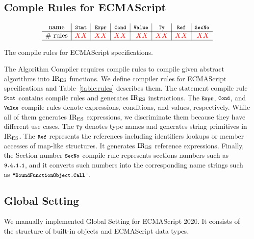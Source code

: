 \subsection{Comple Rules for ECMAScript}

\begin{table}
  \centering
  \[
    \begin{array}{c|r|r|r|r|r|r|r}
      \text{name}
      & \multicolumn{1}{c|}{\code{Stmt}}
      & \multicolumn{1}{c|}{\code{Expr}}
      & \multicolumn{1}{c|}{\code{Cond}}
      & \multicolumn{1}{c|}{\code{Value}}
      & \multicolumn{1}{c|}{\code{Ty}}
      & \multicolumn{1}{c|}{\code{Ref}}
      & \multicolumn{1}{c}{\code{SecNo}}\\\hline
      \text{\# rules}
      & \inred{XX}
      & \inred{XX}
      & \inred{XX}
      & \inred{XX}
      & \inred{XX}
      & \inred{XX}
      & \inred{XX}\\\hline
    \end{array}
  \]
  \caption{The compile rules for ECMAScript specifications.}
  \label{table:rules}
\end{table}

The \textsf{Algorithm Compiler} requires compile rules to compile
given abstract algorithms into \( \text{IR}_\text{ES} \) functions.
We define compiler rules for ECMAScript specifications
and Table~\ref{table:rules} describes them.
The statement compile rule \( \texttt{\footnotesize Stmt} \) contains
 compile rules and generates \( \text{IR}_\text{ES} \) instructions.
The \( \texttt{\footnotesize Expr} \), \( \texttt{\footnotesize Cond} \), and \( \texttt{\footnotesize Value} \)
compile rules denote expressions, conditions, and values, respectively.
While all of them generates \( \text{IR}_\text{ES} \) expressions,
we discriminate them because they have different use cases.
The \( \texttt{\footnotesize Ty} \) denotes type names and generates
string primitives in \( \text{IR}_\text{ES} \). The \( \texttt{\footnotesize Ref} \)
represents the references including identifiers lookups or
member accesses of map-like structures. It generates
\( \text{IR}_\text{ES} \) reference expressions.
Finally, the Section number \( \texttt{\footnotesize SecNo} \) compile rule
represents sections numbers such as \( \texttt{\footnotesize9.4.1.1} \),
and it converts such numbers into the corresponding name strings
such as \( \texttt{\footnotesize"BoundFunctionObject.Call"} \).


\subsection{Global Setting}

We manually implemented \textsf{Global Setting} for ECMAScript 2020.
It consists of the structure of built-in objects and ECMAScript data types.

